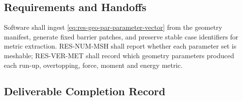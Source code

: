 \subsection{Requirements and Handoffs}
\label{sec:res-geo-par-requirements}

Software shall ingest \cref{eq:res-geo-par-parameter-vector} from the
geometry manifest, generate fixed barrier patches, and preserve stable
case identifiers for metric extraction. RES-NUM-MSH shall report
whether each parameter set is meshable; RES-VER-MET shall record which
geometry parameters produced each run-up, overtopping, force, moment
and energy metric.

\subsection{Deliverable Completion Record}
\label{sec:res-geo-par-completion-record}

%
%
%
